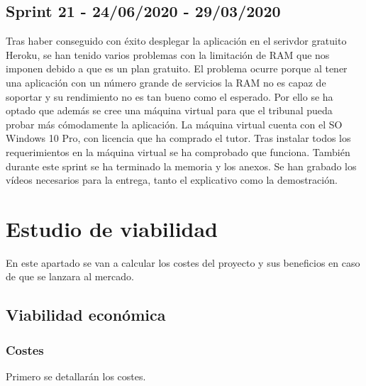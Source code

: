 
\subsection{Sprint 21 - 24/06/2020 - 29/03/2020}
Tras haber conseguido con éxito desplegar la aplicación en el serivdor gratuito Heroku, se han tenido varios problemas con la limitación de RAM que nos imponen debido a que es un plan gratuito. El problema ocurre porque al tener una aplicación con un número grande de servicios la RAM no es capaz de soportar y su rendimiento no es tan bueno como el esperado.
Por ello se ha optado que además se cree una máquina virtual para que el tribunal pueda probar más cómodamente la aplicación.
La máquina virtual cuenta con el SO Windows 10 Pro, con licencia que ha comprado el tutor.
Tras instalar todos los requerimientos en la máquina virtual se ha comprobado que funciona.
También durante este sprint se ha terminado la memoria y los anexos.
Se han grabado los vídeos necesarios para la entrega, tanto el explicativo como la demostración.

\newpage
\section{Estudio de viabilidad}
En este apartado se van a calcular los costes del proyecto y sus beneficios en caso de que se lanzara al mercado.

\subsection{Viabilidad económica}

\subsubsection{Costes}
Primero se detallarán los costes.

